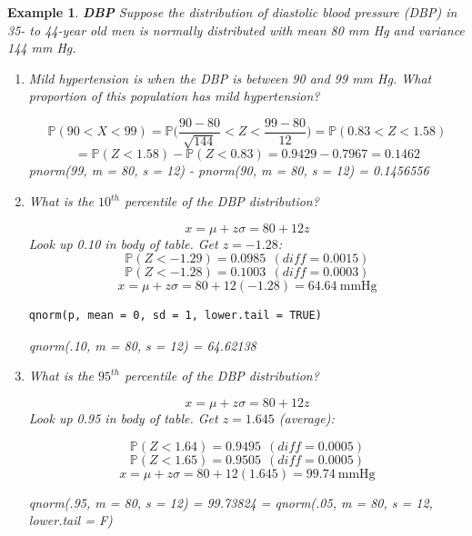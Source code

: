 \documentclass[12pt]{amsart}
\newtheorem{example}[theorem]{Example}
\newcommand{\m}{\mu}
\newcommand{\s}{\sigma}
\newcommand{\bP}{\mathbb{P}}
\begin{document}
{\newpage
\begin{example}  \textbf{DBP} \newline
Suppose the distribution of diastolic blood pressure (DBP) in 35- to 44-year old men is normally distributed with mean 80 mm Hg and variance 144 mm Hg. 

\begin{enumerate}
\item Mild hypertension is when the DBP is between 90 and 99 mm Hg. What proportion of this population has mild hypertension?

\color{blue}
$$\bP( 90 < X < 99 ) = \bP\Big( \frac{90-80}{\sqrt{144}} < Z <  \frac{99-80}{12}\Big) = \bP( 0.83 < Z <  1.58) $$
$$ = \bP(Z <  1.58)  - \bP( Z < 0.83)  = 0.9429 - 0.7967 = 0.1462
$$
pnorm(99, m = 80, s = 12) - pnorm(90, m = 80, s = 12) = 0.1456556

\color{black}

\vfill

\item What is the $10^{th}$ percentile of the DBP distribution?

\color{blue}
$$x = \m +z\s = 80 + 12z$$
Look up 0.10 in body of table. Get $z = -1.28$:
$$ \bP(Z <  -1.29) = 0.0985 ~~(diff = 0.0015)$$
$$ \bP(Z <  -1.28) = 0.1003 ~~(diff = 0.0003)$$
$$x = \m +z\s = 80 + 12(-1.28) = 64.64~ \textrm{mmHg}$$

\begin{verbatim}qnorm(p, mean = 0, sd = 1, lower.tail = TRUE)
\end{verbatim}
qnorm(.10, m = 80, s = 12) =  64.62138
\color{black}

\vfill

\item What is the $95^{th}$ percentile of the DBP distribution?

\color{blue}
$$x = \m +z\s = 80 + 12z$$
Look up 0.95 in body of table. Get $z = 1.645$ (average):

$$ \bP(Z <  1.64) = 0.9495 ~~(diff = 0.0005)$$
$$ \bP(Z <  1.65) = 0.9505~~(diff = 0.0005)$$
$$x = \m +z\s = 80 + 12(1.645) = 99.74~ \textrm{mmHg}$$

qnorm(.95, m = 80, s = 12) =  99.73824 \newline
= qnorm(.05, m = 80, s = 12, lower.tail = F)
\color{black}


\vfill
\end{enumerate}

\end{example} 


}
\end{document}
